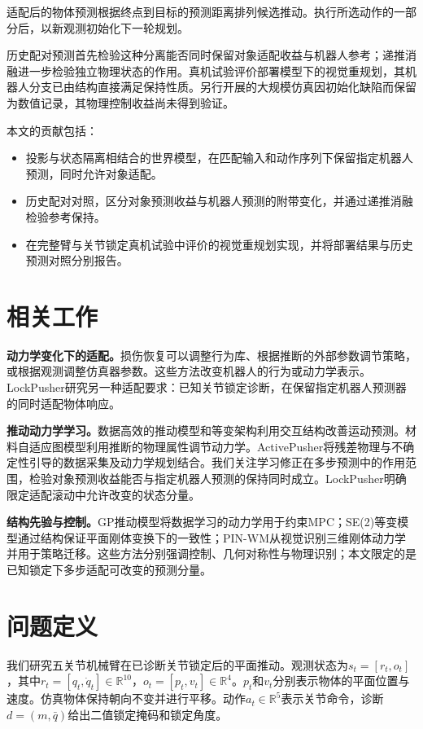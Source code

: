 \documentclass[UTF8,a4paper,10pt,twocolumn]{ctexart}
\begin{document}
适配后的物体预测根据终点到目标的预测距离排列候选推动。执行所选动作的一部分后，以新观测初始化下一轮规划。

历史配对预测首先检验这种分离能否同时保留对象适配收益与机器人参考；递推消融进一步检验独立物理状态的作用。真机试验评价部署模型下的视觉重规划，其机器人分支已由结构直接满足保持性质。另行开展的大规模仿真因初始化缺陷而保留为数值记录，其物理控制收益尚未得到验证。

本文的贡献包括：
\begin{itemize}
\item 投影与状态隔离相结合的世界模型，在匹配输入和动作序列下保留指定机器人预测，同时允许对象适配。
\item 历史配对对照，区分对象预测收益与机器人预测的附带变化，并通过递推消融检验参考保持。
\item 在完整臂与关节锁定真机试验中评价的视觉重规划实现，并将部署结果与历史预测对照分别报告。
\end{itemize}

\section{相关工作}
\textbf{动力学变化下的适配。}损伤恢复可以调整行为库\cite{cully2015robots}、根据推断的外部参数调节策略\cite{kumar2021rma}，或根据观测调整仿真器参数\cite{allevato2020tunenet}。这些方法改变机器人的行为或动力学表示。LockPusher研究另一种适配要求：已知关节锁定诊断，在保留指定机器人预测器的同时适配物体响应。

\textbf{推动动力学学习。}数据高效的推动模型\cite{bauza2018data}和等变架构\cite{kim2023se2}利用交互结构改善运动预测。材料自适应图模型\cite{zhang2024adaptigraph}利用推断的物理属性调节动力学。ActivePusher将残差物理与不确定性引导的数据采集及动力学规划结合\cite{zhong2026activepusher}。我们关注学习修正在多步预测中的作用范围，检验对象预测收益能否与指定机器人预测的保持同时成立。LockPusher明确限定适配滚动中允许改变的状态分量。

\textbf{结构先验与控制。}GP推动模型将数据学习的动力学用于约束MPC\cite{bauza2018data}；SE(2)等变模型通过结构保证平面刚体变换下的一致性\cite{kim2023se2}；PIN-WM从视觉识别三维刚体动力学并用于策略迁移\cite{li2025pinwm}。这些方法分别强调控制、几何对称性与物理识别；本文限定的是已知锁定下多步适配可改变的预测分量。

\section{问题定义}
我们研究五关节机械臂在已诊断关节锁定后的平面推动。观测状态为$s_t=[r_t,o_t]$，其中$r_t=[q_t,\dot q_t]\in\mathbb R^{10}$，$o_t=[p_t,v_t]\in\mathbb R^4$。$p_t$和$v_t$分别表示物体的平面位置与速度。仿真物体保持朝向不变并进行平移。动作$a_t\in\mathbb R^5$表示关节命令，诊断$d=(m,\bar q)$给出二值锁定掩码和锁定角度。
\end{document}
